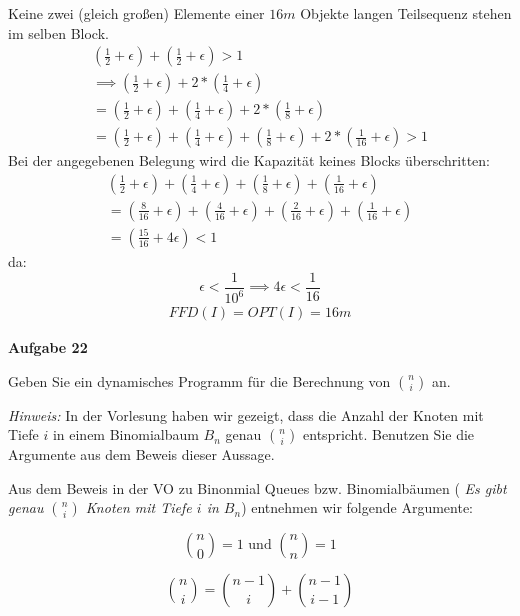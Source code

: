 \documentclass{article}
\begin{document}
Keine zwei (gleich großen) Elemente einer $16m$ Objekte langen Teilsequenz stehen im selben Block.
\begin{align*}
(\frac{1}{2}+\epsilon)+(\frac{1}{2}+\epsilon) > 1\\
\implies (\frac{1}{2}+\epsilon)+2*(\frac{1}{4}+\epsilon)\\ 
=(\frac{1}{2}+\epsilon)+(\frac{1}{4}+\epsilon)+2*(\frac{1}{8}+\epsilon)\\
=(\frac{1}{2}+\epsilon)+(\frac{1}{4}+\epsilon)+(\frac{1}{8}+\epsilon)+2*(\frac{1}{16}+\epsilon) > 1
\end{align*}
\newpage
Bei der angegebenen Belegung wird die Kapazität keines Blocks überschritten:\\
\begin{align*}
(\frac{1}{2}+\epsilon)+(\frac{1}{4}+\epsilon)+(\frac{1}{8}+\epsilon)+(\frac{1}{16}+\epsilon)\\
=(\frac{8}{16}+\epsilon)+(\frac{4}{16}+\epsilon)+(\frac{2}{16}+\epsilon)+(\frac{1}{16}+\epsilon)\\
=(\frac{15}{16}+4\epsilon)<1 
\end{align*}
da:\\
\begin{equation}
	\epsilon<\frac{1}{10^{6}} \implies 4\epsilon<\frac{1}{16}
\end{equation}
\begin{align*}
FFD(I)=OPT(I)=16m
\end{align*}

\clearpage%

{\bfseries Aufgabe 22}%

Geben Sie ein dynamisches Programm f{\"u}r die Berechnung von $\binom{n}{i}$ an.

\emph{Hinweis:} In der Vorlesung haben wir gezeigt, dass die Anzahl der Knoten
mit Tiefe $i$ in einem Binomialbaum $B_n$ genau $\binom{n}{i}$ entspricht.
Benutzen Sie die Argumente aus dem Beweis dieser Aussage.

Aus dem Beweis in der VO zu Binonmial Queues bzw. Binomialb{\"a}umen (
\emph{Es gibt genau $\binom{n}{i}$ Knoten mit Tiefe $i$ in $B_n$}) entnehmen wir
folgende Argumente:

\begin{equation}
\binom{n}{0} = 1 \text{ und } \binom{n}{n} = 1
\end{equation}

\begin{equation}
\binom{n}{i} = \binom{n - 1}{i} + \binom{n - 1}{i - 1}
\end{equation}
\end{document}
